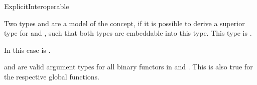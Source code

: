\begin{ccRefConcept}{ExplicitInteroperable}

\ccDefinition

Two types  and  are a model of the  
concept, if it is possible to derive a superior type for  and ,
such that both types are embeddable into this type. 
This type is .  

In this case  
is .

 and  are valid argument types for all binary functors in 
 and .   
This is also true for the respective global functions. 

\ccSeeAlso
{}\\
\\
\\
\\

\end{ccRefConcept}
